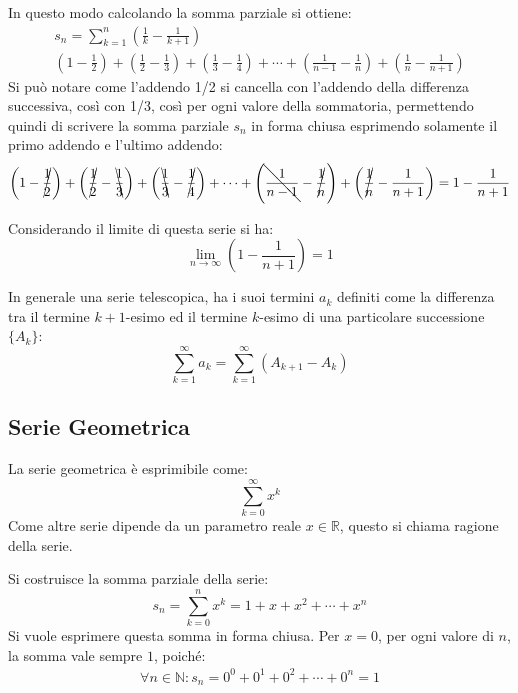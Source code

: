 \documentclass{article}
\numberwithin{equation}{subsection}
\begin{document}
In questo modo calcolando la somma parziale si ottiene:
\begin{gather*}
    s_n=\displaystyle\sum_{k=1}^n\left(\frac{1}{k}-\frac{1}{k+1}\right)\\
    \left({1}-\frac{1}{2}\right)+
    \left(\frac{1}{2}-\frac{1}{3}\right)+
    \left(\frac{1}{3}-\frac{1}{4}\right)+
    \cdots+
    \left(\frac{1}{n-1}-\frac{1}{n}\right)+
    \left(\frac{1}{n}-\frac{1}{n+1}\right)
\end{gather*}
Si può notare come l'addendo 1/2 si cancella con l'addendo della differenza successiva, così con 1/3, così per ogni valore della sommatoria, permettendo quindi di scrivere la somma parziale $s_n$ in forma chiusa esprimendo solamente il primo addendo e l'ultimo addendo:
\begin{gather*}
    \left({1}-\cancel{\frac{1}{2}}\right)+
    \left(\cancel{\frac{1}{2}}-\bcancel{\frac{1}{3}}\right)+
    \left(\bcancel{\frac{1}{3}}-\cancel{\frac{1}{4}}\right)+
    \cdots+
    \left(\bcancel{\frac{1}{n-1}}-\cancel{\frac{1}{n}}\right)+
    \left(\cancel{\frac{1}{n}}-\frac{1}{n+1}\right)=
    1-\frac{1}{n+1}
\end{gather*}

Considerando il limite di questa serie si ha:
\begin{equation*}
    \lim_{n\to\infty}\left(1-\displaystyle\frac{1}{n+1}\right)=1
\end{equation*}

In generale una serie telescopica, ha i suoi termini $a_k$ definiti come la differenza tra il termine $k+1$-esimo ed il termine $k$-esimo di una particolare successione $\{A_k\}$:
\begin{equation*}
    \displaystyle\sum_{k=1}^\infty a_k=\sum_{k=1}^\infty\left(A_{k+1}-A_{k}\right)
\end{equation*} 

\subsection{Serie Geometrica}

La serie geometrica è esprimibile come:
\begin{equation*}
    \displaystyle\sum_{k=0}^\infty x^k
\end{equation*}
Come altre serie dipende da un parametro reale $x\in\mathbb{R}$, questo si chiama ragione della serie. 

Si costruisce la somma parziale della serie:
\begin{equation*}
    s_n=\displaystyle\sum_{k=0}^n x^k=1+x+x^2+\cdots+x^n    
\end{equation*}
Si vuole esprimere questa somma in forma chiusa. Per $x=0$, per ogni valore di $n$, la somma vale sempre $1$, poiché:
\begin{gather*}
    \forall n\in\mathbb{N}: s_n=0^0+0^1+0^2+\cdots+0^n=1
\end{gather*}
\end{document}
